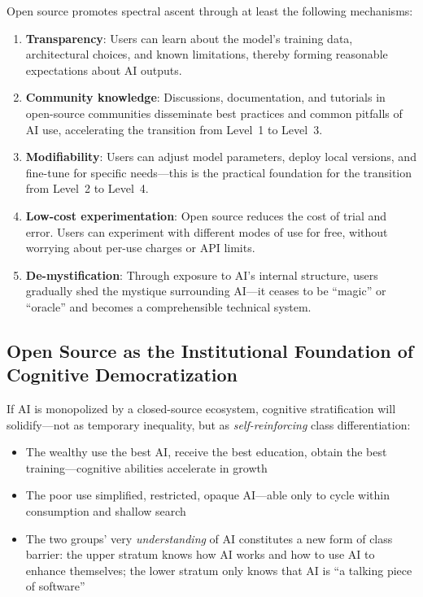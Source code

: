 ﻿\documentclass[12pt,a4paper]{article}
\begin{document}
Open source promotes spectral ascent through at least the following mechanisms:

\begin{enumerate}[label=(\arabic*)]
\item \textbf{Transparency}: Users can learn about the model's training data, architectural choices, and known limitations, thereby forming reasonable expectations about AI outputs.
\item \textbf{Community knowledge}: Discussions, documentation, and tutorials in open-source communities disseminate best practices and common pitfalls of AI use, accelerating the transition from Level~1 to Level~3.
\item \textbf{Modifiability}: Users can adjust model parameters, deploy local versions, and fine-tune for specific needs---this is the practical foundation for the transition from Level~2 to Level~4.
\item \textbf{Low-cost experimentation}: Open source reduces the cost of trial and error. Users can experiment with different modes of use for free, without worrying about per-use charges or API limits.
\item \textbf{De-mystification}: Through exposure to AI's internal structure, users gradually shed the mystique surrounding AI---it ceases to be ``magic'' or ``oracle'' and becomes a comprehensible technical system.
\end{enumerate}

\subsection{Open Source as the Institutional Foundation of Cognitive Democratization}

If AI is monopolized by a closed-source ecosystem, cognitive stratification will solidify---not as temporary inequality, but as \emph{self-reinforcing} class differentiation:

\begin{itemize}
\item The wealthy use the best AI, receive the best education, obtain the best training---cognitive abilities accelerate in growth
\item The poor use simplified, restricted, opaque AI---able only to cycle within consumption and shallow search
\item The two groups' very \emph{understanding} of AI constitutes a new form of class barrier: the upper stratum knows how AI works and how to use AI to enhance themselves; the lower stratum only knows that AI is ``a talking piece of software''
\end{itemize}
\end{document}
